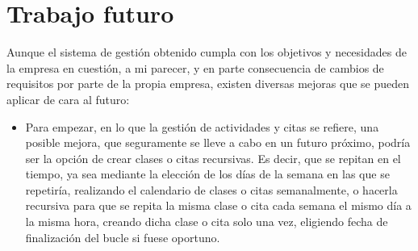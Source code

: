 \section{Trabajo futuro}

Aunque el sistema de gestión obtenido cumpla con los objetivos y necesidades de la empresa en cuestión, a mi parecer, y en parte consecuencia de cambios de requisitos por parte de la propia empresa, existen diversas mejoras que se pueden aplicar de cara al futuro: 

\begin{itemize}
\item Para empezar, en lo que la gestión de actividades y citas se refiere, una posible mejora, que seguramente se lleve a cabo en un futuro próximo, podría ser la opción de crear clases o citas recursivas. Es decir, que se repitan en el tiempo, ya sea mediante la elección de los días de la semana en las que se repetiría, realizando el calendario de clases o citas semanalmente, o hacerla recursiva para que se repita la misma clase o cita cada semana el mismo día a la misma hora, creando dicha clase o cita solo una vez, eligiendo fecha de finalización del bucle si fuese oportuno.


\end{itemize}
